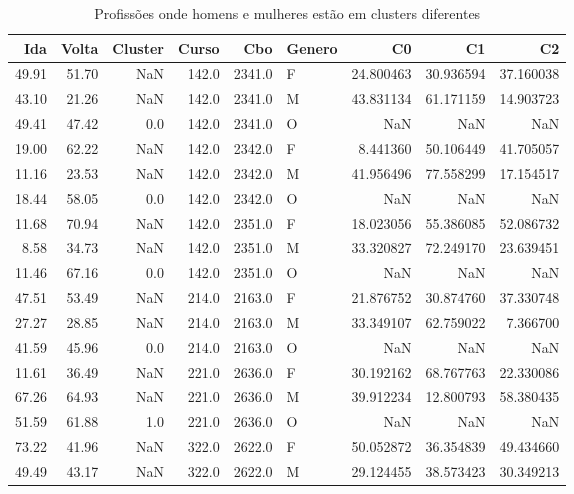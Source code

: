 \begin{table}
\centering
\caption{Profissões onde homens e mulheres estão em clusters diferentes}
\label{tab:Clusters_Diferentes}
\begin{tabular}{rrrrrlrrr}
\toprule
  Ida &  Volta &  Cluster &  Curso &    Cbo & Genero &        C0 &        C1 &        C2 \\
\midrule
49.91 &  51.70 &      NaN &  142.0 & 2341.0 &      F & 24.800463 & 30.936594 & 37.160038 \\
43.10 &  21.26 &      NaN &  142.0 & 2341.0 &      M & 43.831134 & 61.171159 & 14.903723 \\
49.41 &  47.42 &      0.0 &  142.0 & 2341.0 &      O &       NaN &       NaN &       NaN \\
19.00 &  62.22 &      NaN &  142.0 & 2342.0 &      F &  8.441360 & 50.106449 & 41.705057 \\
11.16 &  23.53 &      NaN &  142.0 & 2342.0 &      M & 41.956496 & 77.558299 & 17.154517 \\
18.44 &  58.05 &      0.0 &  142.0 & 2342.0 &      O &       NaN &       NaN &       NaN \\
11.68 &  70.94 &      NaN &  142.0 & 2351.0 &      F & 18.023056 & 55.386085 & 52.086732 \\
 8.58 &  34.73 &      NaN &  142.0 & 2351.0 &      M & 33.320827 & 72.249170 & 23.639451 \\
11.46 &  67.16 &      0.0 &  142.0 & 2351.0 &      O &       NaN &       NaN &       NaN \\
47.51 &  53.49 &      NaN &  214.0 & 2163.0 &      F & 21.876752 & 30.874760 & 37.330748 \\
27.27 &  28.85 &      NaN &  214.0 & 2163.0 &      M & 33.349107 & 62.759022 &  7.366700 \\
41.59 &  45.96 &      0.0 &  214.0 & 2163.0 &      O &       NaN &       NaN &       NaN \\
11.61 &  36.49 &      NaN &  221.0 & 2636.0 &      F & 30.192162 & 68.767763 & 22.330086 \\
67.26 &  64.93 &      NaN &  221.0 & 2636.0 &      M & 39.912234 & 12.800793 & 58.380435 \\
51.59 &  61.88 &      1.0 &  221.0 & 2636.0 &      O &       NaN &       NaN &       NaN \\
73.22 &  41.96 &      NaN &  322.0 & 2622.0 &      F & 50.052872 & 36.354839 & 49.434660 \\
49.49 &  43.17 &      NaN &  322.0 & 2622.0 &      M & 29.124455 & 38.573423 & 30.349213 \\

\end{tabular}
\end{table}
